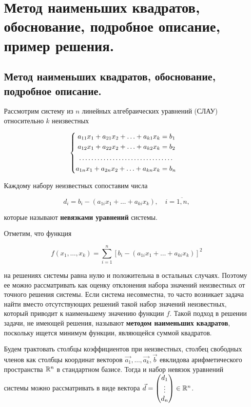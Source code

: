 \section{
    Метод наименьших квадратов, обоснование, подробное описание, пример решения.
}

\subsection{
    Метод наименьших квадратов, обоснование, подробное описание.
}

Рассмотрим систему из $n$ линейных алгебраических уравнений (СЛАУ) относительно $k$ неизвестных

\begin{equation}
    \begin{cases}
        \begin{aligned}
            a_{11} x_1 + a_{21} x_2 + \ldots + a_{k1} x_k &= b_1 \\
            a_{12} x_1 + a_{22} x_2 + \ldots + a_{k2} x_k &= b_2 \\
            \hdotsfor{2} \\
            a_{1n} x_1 + a_{2n} x_2 + \ldots + a_{kn} x_k &= b_n \\
        \end{aligned}
    \end{cases}
    \label{eq:slau_14_1}
\end{equation}

Каждому набору неизвестных сопоставим числа

$$d_i = b_i - (a_{1i}x_1 + \ldots + a_{ki}x_k), \quad i = \overline{1, n},$$

которые называют \textbf{невязками уравнений} системы.

Отметим, что функция 

$$f(x_1, \ldots, x_k) = \sum_{i=1}^{n} [b_i - (a_{1i}x_1 + \ldots + a_{ki}x_k)]^2$$

на решениях системы равна нулю и положительна в остальных случаях. Поэтому ее можно рассматривать как оценку отклонения набора значений неизвестных от точного решения системы. Если система несовместна, то часто возникает задача найти вместо отсутствующих решений такой набор значений неизвестных, который приводит к наименьшему значению функции $f$. Такой подход в решении задачи, не имеющей решения, называют \textbf{методом наименьших квадратов}, поскольку ищется минимум функции, являющейся суммой квадратов.

Будем трактовать столбцы коэффициентов при неизвестных, столбец свободных членов как столбцы координат векторов $\vec{a_1}, \ldots, \vec{a_k}, \vec{b}$ евклидова арифметического пространства $\mathbb{R}^n$ в стандартном базисе. Тогда и набор невязок уравнений системы можно рассматривать в виде вектора $\vec{d} = \begin{pmatrix} d_1 \\ \vdots \\ d_n \end{pmatrix} \in \mathbb{R}^n$.


